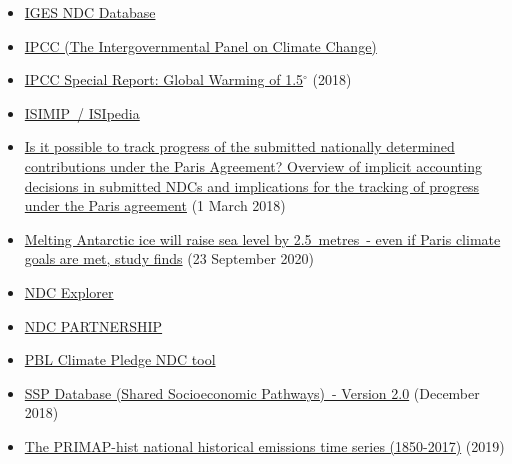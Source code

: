\documentclass[12pt]{article}
\begin{document}
\begin{itemize}
 \vspace{-.2cm} \item \href{https://www.iges.or.jp/en/pub/iges-indc-ndc-database/en}{IGES NDC Database} 
 \vspace{-.2cm} \item \href{https://www.ipcc.ch/}{IPCC (The Intergovernmental Panel on Climate Change)} 
 \vspace{-.2cm} \item \href{https://www.ipcc.ch/sr15/}{IPCC Special Report: Global Warming of 1.5$^{\circ}$} (2018)
 \vspace{-.2cm} \item \href{https://www.isimip.org/isipedia/#isipedia-portal}{ISIMIP~/ ISIpedia} 
 \vspace{-.2cm} \item \href{https://www.oeko.de/fileadmin/oekodoc/Tracking-progress-of-INDCs.pdf}{Is it possible to track progress of the submitted nationally determined contributions under the Paris Agreement? Overview of implicit accounting decisions in submitted NDCs and implications for the tracking of progress under the Paris agreement} (1 March 2018)
 \vspace{-.2cm} \item \href{https://www.theguardian.com/environment/2020/sep/23/melting-antarctic-ice-will-raise-sea-level-by-25-metres-even-if-paris-climate-goals-are-met-study-finds?CMP=share_btn_tw&utm_campaign=Carbon\%20Brief\%20Daily\%20Briefing&utm_medium=email&utm_source=Revue\%20newsletter}{Melting Antarctic ice will raise sea level by 2.5~metres~- even if Paris climate goals are met, study finds} (23 September 2020)
 \vspace{-.2cm} \item \href{https://klimalog.die-gdi.de/ndc/#NDCExplorer/worldMap?NDC??income???catIncome}{NDC Explorer} 
 \vspace{-.2cm} \item \href{https://ndcpartnership.org/}{NDC PARTNERSHIP} 
 \vspace{-.2cm} \item \href{https://themasites.pbl.nl/o/climate-ndc-policies-tool/}{PBL Climate Pledge NDC tool} 
 \vspace{-.2cm} \item \href{https://tntcat.iiasa.ac.at/SspDb/dsd?Action=htmlpage&page=about}{SSP Database (Shared Socioeconomic Pathways)~- Version 2.0} (December 2018)
 \vspace{-.2cm} \item \href{https://dataservices.gfz-potsdam.de/pik/showshort.php?id=escidoc:4736895}{The PRIMAP-hist national historical emissions time series (1850-2017)} (2019)

\end{itemize}
\end{document}
